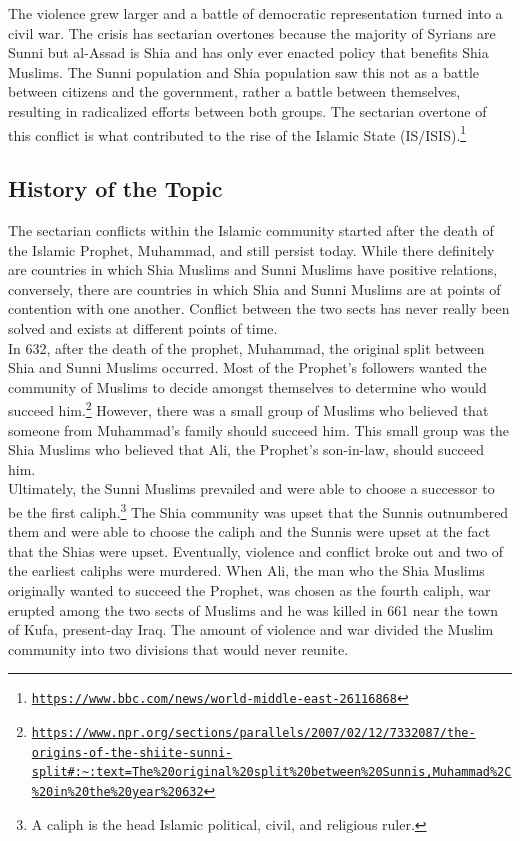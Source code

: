 \documentclass[10pt, letterpaper]{article}
\begin{document}
The violence grew larger and a battle of democratic representation
turned into a civil war. The crisis has sectarian overtones because the
majority of Syrians are Sunni but al-Assad is Shia and has only ever
enacted policy that benefits Shia Muslims. The Sunni population and Shia
population saw this not as a battle between citizens and the government,
rather a battle between themselves, resulting in radicalized efforts
between both groups. The sectarian overtone of this conflict is what
contributed to the rise of the Islamic State (IS/ISIS).\texttt{\texttt{\footnote{\href{https://www.bbc.com/news/world-middle-east-26116868}{{https://www.bbc.com/news/world-middle-east-26116868}}}}} \\

\subsection{History of the Topic}

The sectarian conflicts within the Islamic community started after the
death of the Islamic Prophet, Muhammad, and still persist today. While
there definitely are countries in which Shia Muslims and Sunni Muslims
have positive relations, conversely, there are countries in which Shia
and Sunni Muslims are at points of contention with one another. Conflict
between the two sects has never really been solved and exists at
different points of time. \\

In 632, after the death of the prophet, Muhammad, the original split
between Shia and Sunni Muslims occurred. Most of the Prophet's followers
wanted the community of Muslims to decide amongst themselves to
determine who would succeed him.\footnote{\texttt{\href{https://www.npr.org/sections/parallels/2007/02/12/7332087/the-origins-of-the-shiite-sunni-split\#:~:text=The\%20original\%20split\%20between\%20Sunnis,Muhammad\%2C\%20in\%20the\%20year\%20632}{{https://www.npr.org/sections/parallels/2007/02/12/7332087/the-origins-of-the-shiite-sunni-split\#:\textasciitilde:text=The\%20original\%20split\%20between\%20Sunnis,Muhammad\%2C\%20in\%20the\%20year\%20632}}}}
However, there was a small group of Muslims who believed that someone
from Muhammad's family should succeed him. This small group was the Shia
Muslims who believed that Ali, the Prophet's son-in-law, should succeed
him. \\

Ultimately, the Sunni Muslims prevailed and were able to choose a
successor to be the first caliph.\footnote{A caliph is the head Islamic
  political, civil, and religious ruler.} The Shia community was upset
that the Sunnis outnumbered them and were able to choose the caliph and
the Sunnis were upset at the fact that the Shias were upset. Eventually,
violence and conflict broke out and two of the earliest caliphs were
murdered. When Ali, the man who the Shia Muslims originally wanted to
succeed the Prophet, was chosen as the fourth caliph, war erupted among
the two sects of Muslims and he was killed in 661 near the town of Kufa,
present-day Iraq. The amount of violence and war divided the Muslim
community into two divisions that would never reunite. \\
\end{document}
